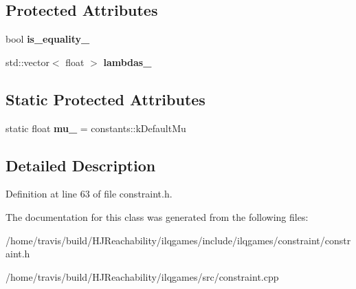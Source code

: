 \subsection*{Protected Attributes}
\begin{DoxyCompactItemize}
\item 
bool {\bfseries is\+\_\+equality\+\_\+}\hypertarget{classilqgames_1_1_constraint_ae045194a79f1cb886fd969c4fd55faf8}{}\label{classilqgames_1_1_constraint_ae045194a79f1cb886fd969c4fd55faf8}

\item 
std\+::vector$<$ float $>$ {\bfseries lambdas\+\_\+}\hypertarget{classilqgames_1_1_constraint_ac04602b21370f03090bda557c88f3da7}{}\label{classilqgames_1_1_constraint_ac04602b21370f03090bda557c88f3da7}

\end{DoxyCompactItemize}
\subsection*{Static Protected Attributes}
\begin{DoxyCompactItemize}
\item 
static float {\bfseries mu\+\_\+} = constants\+::k\+Default\+Mu\hypertarget{classilqgames_1_1_constraint_a8622600933da02b1f3f7b05b02c40d9a}{}\label{classilqgames_1_1_constraint_a8622600933da02b1f3f7b05b02c40d9a}

\end{DoxyCompactItemize}


\subsection{Detailed Description}


Definition at line 63 of file constraint.\+h.



The documentation for this class was generated from the following files\+:\begin{DoxyCompactItemize}
\item 
/home/travis/build/\+H\+J\+Reachability/ilqgames/include/ilqgames/constraint/constraint.\+h\item 
/home/travis/build/\+H\+J\+Reachability/ilqgames/src/constraint.\+cpp\end{DoxyCompactItemize}
